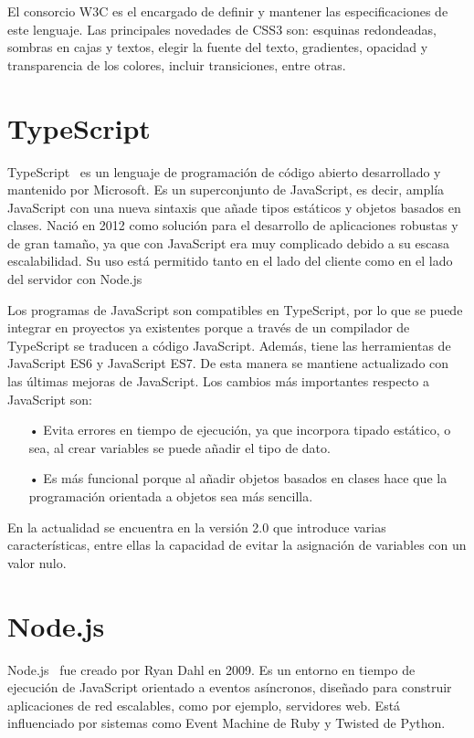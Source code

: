 \documentclass[a4paper, 12pt]{book}
\begin{document}
El consorcio W3C es el encargado de definir y mantener las especificaciones de este lenguaje. 
Las principales novedades de CSS3 son: esquinas redondeadas, sombras en cajas y textos, elegir la fuente del texto, gradientes, opacidad y transparencia de los colores, incluir transiciones, entre otras.

\section{TypeScript} 
\label{sec:TypeScript}

TypeScript~\cite{Pagina_de_typescript} es un lenguaje de programación de código abierto desarrollado y mantenido por Microsoft. 
Es un superconjunto de JavaScript, es decir, amplía JavaScript con una nueva sintaxis que añade tipos estáticos y objetos basados en clases. 
Nació en 2012 como solución para el desarrollo de aplicaciones  robustas y de gran tamaño, ya que con JavaScript era muy complicado debido a su escasa escalabilidad. 
Su uso está permitido tanto en el lado del cliente como en el lado del servidor con Node.js

 Los programas de JavaScript son compatibles en TypeScript, por lo que se puede integrar en proyectos ya existentes porque a través de un compilador de TypeScript se traducen a código JavaScript. 
Además, tiene las herramientas de JavaScript ES6 y JavaScript ES7. De esta manera se mantiene actualizado con las últimas mejoras de JavaScript. 
Los cambios más importantes respecto a JavaScript son:

\begin{itemize}
	\item[•] Evita errores en tiempo de ejecución, ya que incorpora tipado estático, o sea, al crear variables se puede añadir el tipo de dato.
	
	\item[•] Es más funcional porque al añadir objetos basados en clases hace que la programación orientada a objetos sea más sencilla.
\end{itemize}

En la actualidad se encuentra en la versión 2.0 que introduce varias características, entre ellas la capacidad de evitar la asignación de variables con un valor nulo. 

\section{Node.js} 
\label{sec:Node}

Node.js~\cite{Pagina_de_Node} fue creado por Ryan Dahl en 2009. Es un entorno en tiempo de ejecución de JavaScript orientado a eventos asíncronos, diseñado para construir aplicaciones de red escalables, como por ejemplo, servidores web. 
Está influenciado por sistemas como Event Machine de Ruby y Twisted de Python.
\end{document}
